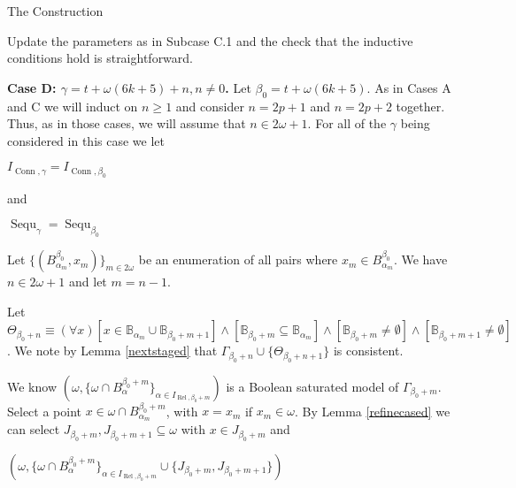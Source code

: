\documentclass{amsart}
\theoremstyle{definition}\newtheorem{theorem}{Theorem}
\theoremstyle{definition}\newtheorem{bigtheorem}{Theorem}
\numberwithin{theorem}{section}
\theoremstyle{definition}\newtheorem{corollary}[theorem]{Corollary}
\theoremstyle{definition}\newtheorem{proposition}[theorem]{Proposition}
\theoremstyle{definition}\newtheorem{definition}[theorem]{Definition}
\theoremstyle{definition}\newtheorem{question}[theorem]{Question}
\theoremstyle{definition}\newtheorem{example}[theorem]{Example}
\theoremstyle{definition}\newtheorem{remark}[theorem]{Remark}
\theoremstyle{definition}\newtheorem{note}[theorem]{Note}
\theoremstyle{definition}\newtheorem{lemma}[theorem]{Lemma}
\theoremstyle{definition}\newtheorem{fact}[theorem]{Fact}
\theoremstyle{definition}\newtheorem{define}[theorem]{Definition}
\theoremstyle{definition}\newtheorem{definitions}[theorem]{Definitions}
\theoremstyle{definition}\newtheorem{claim}[theorem]{Claim}
\theoremstyle{definition}\newtheorem{obs}[theorem]{Observation}
\theoremstyle{definition}\newtheorem{construction}[theorem]{Construction}
\newcommand{\B}{\mathbb{B}}
\newcommand{\Rel}{\operatorname{Rel}}
\newcommand{\Conn}{\operatorname{Conn}}
\newcommand{\Sequ}{\operatorname{Sequ}}
\begin{document}
\begin{section}{The Construction}
\begin{center}
\end{center}


Update the parameters as in Subcase C.1 and the check that the inductive conditions hold is straightforward.









\noindent \textbf{Case D: $ \gamma = t + \omega(6k + 5) + n, n \neq 0$.}  Let $\beta_0 = t + \omega(6k + 5)$.  As in Cases A and C we will induct on $n \geq 1$ and consider $n = 2p + 1$ and $n = 2p + 2$ together.  Thus, as in those cases, we will assume that $n\in 2\omega + 1$.  For all of the $\gamma$ being considered in this case we let

\begin{center}
$I_{\Conn, \gamma} = I_{\Conn, \beta_0}$
\end{center}

\noindent and

\begin{center}
$\Sequ_{\gamma} = \Sequ_{\beta_0}$
\end{center}


Let $\{(B_{\alpha_m}^{\beta_0}, x_m)\}_{m \in 2\omega}$ be an enumeration of all pairs  where $x_m \in B_{\alpha_m}^{\beta_0}$.  We have $n\in 2\omega + 1$ and let $m = n - 1$.

Let $\Theta_{\beta_0 + n} \equiv (\forall x)[x\in \B_{\alpha_m} \cup \B_{\beta_0 + m + 1}] \wedge [\B_{\beta_0 + m} \subseteq \B_{\alpha_m}] \wedge [\B_{\beta_0 + m} \neq \emptyset] \wedge [\B_{\beta_0 + m + 1}\neq \emptyset]$.  We note by Lemma \ref{nextstaged} that $\Gamma_{\beta_0 + n} \cup \{\Theta_{\beta_0 + n + 1}\}$ is consistent.

We know $(\omega, \{\omega \cap B_{\alpha}^{\beta_0 + m}\}_{\alpha \in I_{\Rel, \beta_0 + m}})$ is a Boolean saturated model of $\Gamma_{\beta_0 + m}$.  Select a point $x\in \omega \cap B_{\alpha_m}^{\beta_0 + m}$, with $x = x_m$ if $x_m \in \omega$.  By Lemma \ref{refinecased} we can select $J_{\beta_0 + m}, J_{\beta_0 + m + 1} \subseteq \omega$ with $x\in J_{\beta_0 + m}$ and

\begin{center}

$(\omega, \{\omega \cap B_{\alpha}^{\beta_0 + m}\}_{\alpha \in I_{\Rel, \beta_0 + m}} \cup \{J_{\beta_0 + m}, J_{\beta_0 + m + 1}\})$

\end{center}


\end{section}
\end{document}
